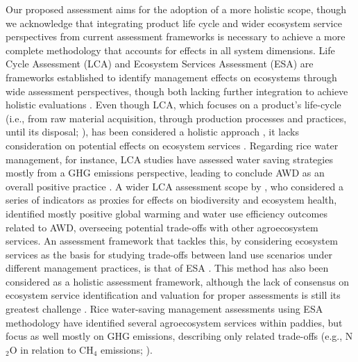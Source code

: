 Our proposed assessment aims for the adoption of a more holistic scope, though we acknowledge that integrating product life cycle and wider ecosystem service perspectives from current assessment frameworks is necessary to achieve a more complete methodology that accounts for effects in all system dimensions. Life Cycle Assessment (LCA) and Ecosystem Services Assessment (ESA) are frameworks established to identify management effects on ecosystems through wide assessment perspectives, though both lacking further integration to achieve holistic evaluations \citep{delucapena2022}. Even though LCA, which focuses on a product's life-cycle (i.e., from raw material acquisition, through production processes and practices, until its disposal; \cite{finnveden2009}), has been considered a holistic approach \citep{urbaniec2017}, it lacks consideration on potential effects on ecosystem services \citep{zhang2010accounting, d2020review}. Regarding rice water management, for instance, LCA studies have assessed water saving strategies mostly from a GHG emissions perspective, leading to conclude AWD as an overall positive practice \citep{abdulrahman2019, leon2022}. A wider LCA assessment scope by \cite{darzi-naftchali2025}, who considered a series of indicators as proxies for effects on biodiversity and ecosystem health, identified mostly positive global warming and water use efficiency outcomes related to AWD, overseeing potential trade-offs with other agroecosystem services. An assessment framework that tackles this, by considering ecosystem services as the basis for studying trade-offs between land use scenarios under different management practices, is that of ESA \citep{baskent2020}. This method has also been considered as a holistic assessment framework, although the lack of consensus on ecosystem service identification and valuation for proper assessments is still its greatest challenge \citep{menzie2012}. Rice water-saving management assessments using ESA methodology have identified several agroecosystem services within paddies, but focus as well mostly on GHG emissions, describing only related trade-offs (e.g., N$_{2}$O in relation to CH$_{4}$ emissions; \cite{chivenge2020}).\\

